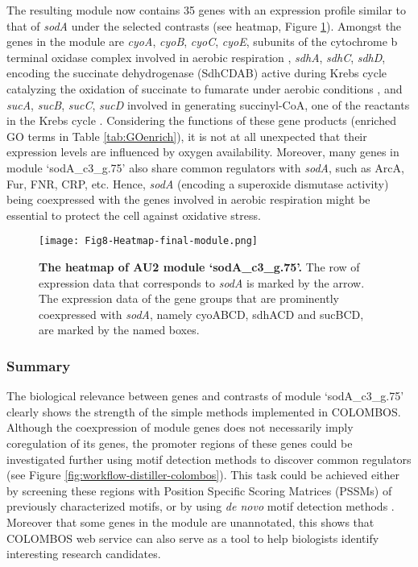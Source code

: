 The resulting module now contains 35 genes with an expression profile similar
to that of \textit{sodA} under the selected contrasts (see heatmap, Figure
\ref{fig:colombos-heatmap-final}).  Amongst the genes in the module are
\textit{cyoA}, \textit{cyoB}, \textit{cyoC}, \textit{cyoE}, subunits of the
cytochrome b terminal oxidase complex involved in aerobic respiration
\cite{Cotter1992}, \textit{sdhA}, \textit{sdhC}, \textit{sdhD}, encoding the
succinate dehydrogenase (SdhCDAB) active during Krebs cycle catalyzing the
oxidation of succinate to fumarate under aerobic conditions \cite{Wilde1986},
and \textit{sucA}, \textit{sucB}, \textit{sucC}, \textit{sucD} involved in
generating succinyl-CoA, one of the reactants in the Krebs cycle
\cite{Buck1989}.  
%
Considering the functions of these gene products (enriched GO terms in Table
\ref{tab:GOenrich}), it is not at all unexpected that their expression levels
are influenced by oxygen availability.  Moreover, many genes in module
`sodA\_c3\_g.75' also share common regulators with \textit{sodA}, such as
ArcA, Fur, FNR, CRP, etc. Hence, \textit{sodA} (encoding a superoxide
dismutase activity) being coexpressed with the genes involved in aerobic
respiration might be essential to protect the cell against oxidative stress.
%
\begin{figure}[tb]
	\centering
  	\texttt{[image: Fig8-Heatmap-final-module.png]}
	\caption[COLOMBOS heatmap of module `sodA\_c3\_g.75']{
	\textbf{The heatmap of AU2 module `sodA\_c3\_g.75'.}
	The row of expression data that corresponds to \textit{sodA} is
	marked by the arrow. The expression data of the gene groups that are 
	prominently coexpressed with \textit{sodA}, namely cyoABCD, sdhACD and 
	sucBCD, are marked by the named boxes.}
	\label{fig:colombos-heatmap-final}
\end{figure}


\subsubsection{Summary}

The biological relevance between genes and contrasts of module
`sodA\_c3\_g.75' clearly shows the strength of the simple methods implemented
in COLOMBOS.
%
Although the coexpression of module genes does not necessarily imply
coregulation of its genes, 
%
the promoter regions of these genes could be investigated further using motif
detection methods to discover common regulators (see
Figure \ref{fig:workflow-distiller-colombos}).
%
This task could be achieved either by screening these regions with Position
Specific Scoring Matrices (PSSMs) of previously characterized motifs, or by
using \textit{de novo} motif detection methods \cite{Tompa2005, Storms2010}.
%
Moreover that some genes in the module are unannotated, this shows that
COLOMBOS web service can also serve as a tool to help biologists identify
interesting research candidates.




